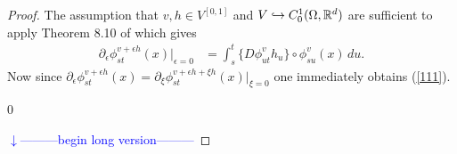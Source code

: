 \documentclass[noinfoline]{imsart}
\def\Ver{1}
\def\LongVer{0}
\begin{document}
\begin{proof} The assumption that $v,h \in V^{[0,1]}$ and $V\hookrightarrow C_0^1(\Omega,\Bbb R^d)$ are sufficient to apply
Theorem 8.10 of \cite{you:10} which gives
\begin{align*}
{\partial_\epsilon}  \phi^{ v+\epsilon h}_{st}(x) \bigr|_{\epsilon = 0} &= \int_s^t  \bigl\{D\phi^{ v}_{ut} h_u \bigr\}\circ{\phi^{ v}_{su}(x)}\,   du.
 \end{align*}
 Now since ${\partial_\epsilon}  \phi^{ v+\epsilon h}_{st}(x) = {\partial_\xi}  \phi^{ v+\epsilon h+\xi h}_{st}(x)\bigr|_{\xi = 0} $ one immediately obtains (\ref{111}).

\if\Ver\LongVer{
{\flushleft\textcolor{blue}{$\downarrow$---------begin long version---------}}\newline

}
\end{proof}
\end{document}
